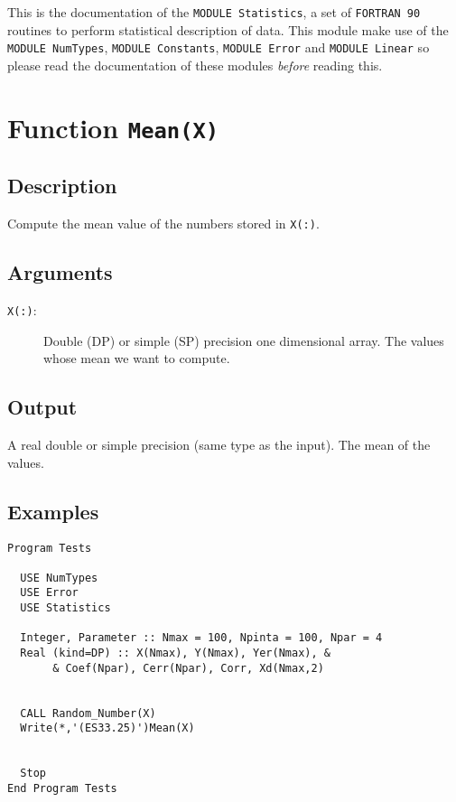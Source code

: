 This is the documentation of the \texttt{MODULE Statistics}, a set
of \texttt{FORTRAN 90} routines to perform statistical description
of data. This module make use of the \texttt{MODULE NumTypes},
\texttt{MODULE Constants}, \texttt{MODULE Error} and \texttt{MODULE
  Linear} so please read the documentation of these modules
\emph{before} reading this. 

\section{Function \texttt{Mean(X)}}

\subsection{Description}

Compute the mean value of the numbers stored in \texttt{X(:)}.

\subsection{Arguments}

\begin{description}
\item[\texttt{X(:)}:] Double (DP) or simple (SP) precision one
  dimensional array. The values  whose mean we want to compute.
\end{description}

\subsection{Output}

A real double or simple precision (same type as the input). The mean
of the values.

\subsection{Examples}

\begin{verbatim}
Program Tests

  USE NumTypes
  USE Error
  USE Statistics

  Integer, Parameter :: Nmax = 100, Npinta = 100, Npar = 4
  Real (kind=DP) :: X(Nmax), Y(Nmax), Yer(Nmax), &
       & Coef(Npar), Cerr(Npar), Corr, Xd(Nmax,2)


  CALL Random_Number(X)
  Write(*,'(ES33.25)')Mean(X)


  Stop
End Program Tests
\end{verbatim}


